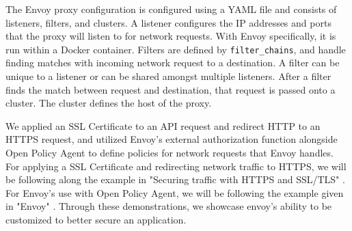 The Envoy proxy configuration is configured using a YAML file and consists of listeners, filters, 
and clusters. A listener configures the IP addresses and ports that the proxy will listen to for 
network requests. With Envoy specifically, it is run within a Docker container. Filters are 
defined by \verb|filter_chains|, and handle finding matches with incoming network request to a 
destination. A filter can be unique to a listener or can be shared amongst multiple listeners. 
After a filter finds the match between request and destination, that request is passed onto a cluster. 
The cluster defines the host of the proxy. 

We applied an SSL Certificate to an API request and redirect HTTP to an HTTPS request, and utilized 
Envoy's external authorization function alongside Open Policy Agent to define policies for network 
requests that Envoy handles. For applying a SSL Certificate and redirecting network traffic to HTTPS, 
we will be following along the example in "Securing traffic with HTTPS and SSL/TLS" \cite{envoy_ssl}. 
For Envoy's use with Open Policy Agent, we will be following the example given in "Envoy" \cite{envoy_opa}. 
Through these demonstrations, we showcase envoy's ability to be customized to better secure an application.
